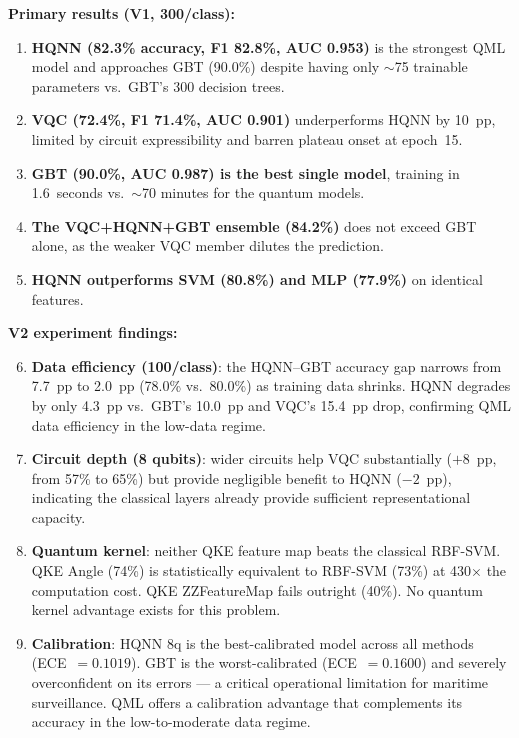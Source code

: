 \documentclass[journal]{IEEEtran}
\begin{document}
\noindent\textbf{Primary results (V1, 300/class):}
\begin{enumerate}
  \item \textbf{HQNN (82.3\% accuracy, F1 82.8\%, AUC 0.953)} is the strongest
        QML model and approaches GBT (90.0\%) despite having only $\sim$75
        trainable parameters vs.\ GBT's 300 decision trees.
  \item \textbf{VQC (72.4\%, F1 71.4\%, AUC 0.901)} underperforms HQNN by
        10~pp, limited by circuit expressibility and barren plateau onset at
        epoch~15.
  \item \textbf{GBT (90.0\%, AUC 0.987) is the best single model}, training
        in 1.6~seconds vs.\ $\sim$70 minutes for the quantum models.
  \item \textbf{The VQC+HQNN+GBT ensemble (84.2\%)} does not exceed GBT alone,
        as the weaker VQC member dilutes the prediction.
  \item \textbf{HQNN outperforms SVM (80.8\%) and MLP (77.9\%)} on identical
        features.
\end{enumerate}

\noindent\textbf{V2 experiment findings:}
\begin{enumerate}
  \setcounter{enumi}{5}
  \item \textbf{Data efficiency (100/class)}: the HQNN--GBT accuracy gap narrows
        from 7.7~pp to 2.0~pp (78.0\% vs.\ 80.0\%) as training data shrinks.
        HQNN degrades by only 4.3~pp vs.\ GBT's 10.0~pp and VQC's 15.4~pp
        drop, confirming QML data efficiency in the low-data regime.
  \item \textbf{Circuit depth (8 qubits)}: wider circuits help VQC substantially
        ($+8$~pp, from 57\% to 65\%) but provide negligible benefit to HQNN
        ($-2$~pp), indicating the classical layers already provide sufficient
        representational capacity.
  \item \textbf{Quantum kernel}: neither QKE feature map beats the classical
        RBF-SVM. QKE Angle (74\%) is statistically equivalent to RBF-SVM (73\%)
        at 430$\times$ the computation cost. QKE ZZFeatureMap fails outright
        (40\%). No quantum kernel advantage exists for this problem.
  \item \textbf{Calibration}: HQNN 8q is the best-calibrated model across all
        methods (ECE~$= 0.1019$). GBT is the worst-calibrated (ECE~$= 0.1600$)
        and severely overconfident on its errors — a critical operational
        limitation for maritime surveillance. QML offers a calibration advantage
        that complements its accuracy in the low-to-moderate data regime.
\end{enumerate}
\end{document}
